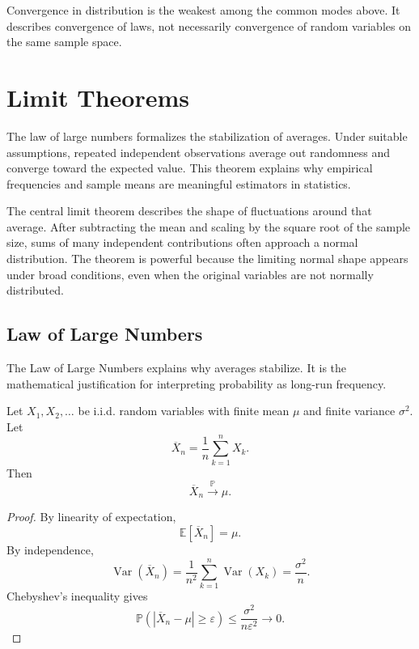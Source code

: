 \begin{remark}
Convergence in distribution is the weakest among the common modes above. It describes convergence of laws, not necessarily convergence of random variables on the same sample space.
\end{remark}

\section{Limit Theorems}


The law of large numbers formalizes the stabilization of averages. Under suitable assumptions, repeated independent observations average out randomness and converge toward the expected value. This theorem explains why empirical frequencies and sample means are meaningful estimators in statistics.

The central limit theorem describes the shape of fluctuations around that average. After subtracting the mean and scaling by the square root of the sample size, sums of many independent contributions often approach a normal distribution. The theorem is powerful because the limiting normal shape appears under broad conditions, even when the original variables are not normally distributed.

\subsection{Law of Large Numbers}

The Law of Large Numbers explains why averages stabilize. It is the mathematical justification for interpreting probability as long-run frequency.

\begin{theorem}
Let $X_1,X_2,\dots$ be i.i.d. random variables with finite mean $\mu$ and finite variance $\sigma^2$. Let
\[
    \overline{X}_n=\frac{1}{n}\sum_{k=1}^{n}X_k.
\]
Then
\[
    \overline{X}_n\xrightarrow{\mathbb{P}}\mu.
\]
\end{theorem}

\begin{proof}
By linearity of expectation,
\[
    \mathbb{E}[\overline{X}_n]=\mu.
\]
By independence,
\[
    \operatorname{Var}(\overline{X}_n)=\frac{1}{n^2}\sum_{k=1}^{n}\operatorname{Var}(X_k)=\frac{\sigma^2}{n}.
\]
Chebyshev's inequality gives
\[
    \mathbb{P}(|\overline{X}_n-\mu|\geq\varepsilon)
    \leq\frac{\sigma^2}{n\varepsilon^2}\to 0.
\]
\end{proof}

